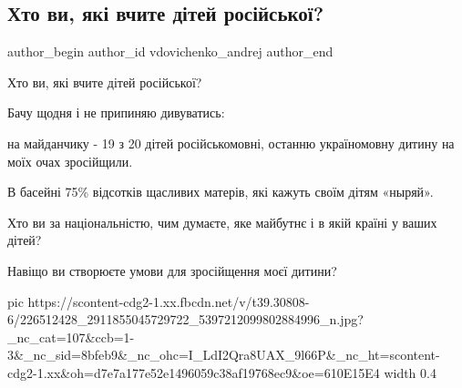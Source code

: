  
 
 
 
 
 
\subsection{Хто ви, які вчите дітей російської?}
\label{sec:30_07_2021.fb.vdovichenko_andrej.1.deti_jazyk}
 
\ifcmt
 author_begin
   author_id vdovichenko_andrej
 author_end
\fi

Хто ви, які вчите дітей російської?

Бачу щодня і не припиняю дивуватись: 

на майданчику - 19 з 20 дітей російськомовні, останню україномовну дитину на моїх очах зросійщили.

В басейні 75\% відсотків щасливих матерів, які кажуть своїм дітям «ныряй».

Хто ви за національністю, чим думаєте, яке майбутнє і в якій країні у ваших дітей?

Навіщо ви створюєте умови для зросійщення моєї дитини?

\ifcmt
  pic https://scontent-cdg2-1.xx.fbcdn.net/v/t39.30808-6/226512428_2911855045729722_5397212099802884996_n.jpg?_nc_cat=107&ccb=1-3&_nc_sid=8bfeb9&_nc_ohc=I_LdI2Qra8UAX_9l66P&_nc_ht=scontent-cdg2-1.xx&oh=d7e7a177e52e1496059c38af19768ec9&oe=610E15E4
  width 0.4
\fi

